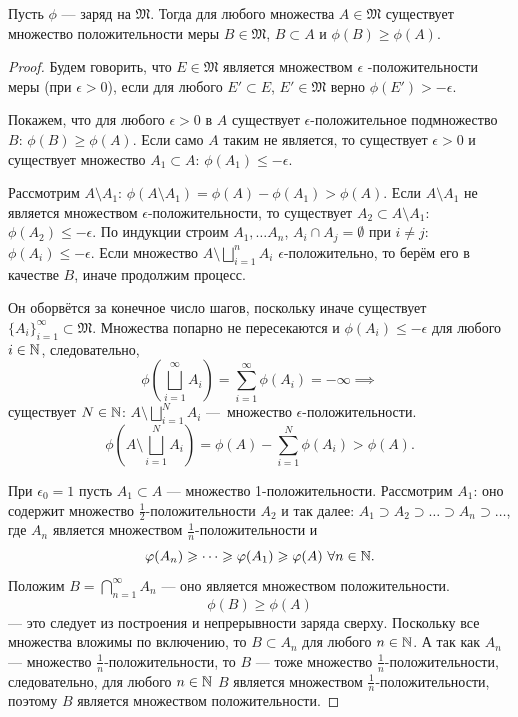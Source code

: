 \begin{theorem}
    Пусть $\phi$ — заряд на $\mathfrak{M}$.
    Тогда для любого множества $A \in \mathfrak{M}$ существует множество положительности меры $B \in \mathfrak{M}$, $B \subset A$ и $\phi(B) \geqslant \phi(A)$.
\end{theorem} 
\begin{proof}
    Будем говорить, что $E \in \mathfrak{M}$ является множеством $\epsilon$ -положительности меры (при $\epsilon>0$), если для любого $E' \subset E$, $E' \in \mathfrak{M}$ верно $\phi(E') > -\epsilon$.

    Покажем, что для любого $\epsilon>0$ в $A$ существует $\epsilon$-положительное подмножество $B$: $\phi(B) \geqslant \phi(A)$.
    Если само $A$ таким не является, то существует $\epsilon>0$ и существует множество $A_1 \subset A$: $\phi(A_1) \leqslant -\epsilon$.

    Рассмотрим $A \setminus A_1$: $\phi(A \setminus A_1) = \phi(A) - \phi(A_1) > \phi(A)$.
    Если $A \setminus A_1$ не является множеством $\epsilon$-положительности, то существует $A_2 \subset A \setminus A_1$: $\phi(A_2) \leqslant -\epsilon$.
    По индукции строим $A_1, \dots A_n$, $A_i \cap A_j = \emptyset$ при $i \neq j$: $\phi(A_i) \leqslant -\epsilon$.
    Если множество $A \setminus \bigsqcup\limits_{i=1}^{n}A_i$ $\epsilon$-положительно, то берём его в качестве $B$, иначе продолжим процесс.

    Он оборвётся за конечное число шагов, поскольку иначе существует $\{A_i\}_{i=1}^\infty  \subset \mathfrak{M}$.
    Множества попарно не пересекаются и $\phi(A_i) \leqslant -\epsilon$ для любого $i \in \mathbb{N}$, следовательно,
    \[\phi\left(\bigsqcup\limits_{i=1}^{\infty}A_i\right) = \sum\limits_{i=1}^{\infty}\phi(A_i) = -\infty \implies\]
    существует $N \in \mathbb{N}$: $A \setminus \bigsqcup\limits_{i=1}^{N}A_i$ — множество $\epsilon$-положительности.
    \[\phi\left(A \setminus \bigsqcup\limits_{i=1}^{N}A_i\right) = \phi(A) - \sum\limits_{i=1}^{N}\phi(A_i) > \phi(A).\]
    
    При $\epsilon_0 = 1$ пусть $A_1 \subset A$ — множество 1-положительности.
    Рассмотрим $A_1$: оно содержит множество $\frac{1}{2}$-положительности $A_2$ и так далее: $A_1 \supset A_2 \supset \dots \supset A_n \supset \dots$, где $A_n$ является множеством $\frac{1}{n}$-положительности и
    \[\varphi(A_n) \geqslant \dots \geqslant \varphi(A_1) \geqslant \varphi(A) \ \forall n \in \mathbb{N}.\]
    Положим $B = \bigcap\limits_{n=1}^{\infty}A_n$ — оно является множеством положительности.
    \[\phi(B) \geqslant \phi(A)\]
    — это следует из построения и непрерывности заряда сверху.
    Поскольку все множества вложимы по включению, то $B \subset A_n$ для любого $n \in \mathbb{N}$.
    А так как $A_n$ — множество $\frac{1}{n}$-положительности, то $B$ — тоже множество $\frac{1}{n}$-положительности, следовательно, для любого $n \in \mathbb{N}$ $B$ является множеством $\frac{1}{n}$-положительности, поэтому $B$ является множеством положительности.
\end{proof} 

